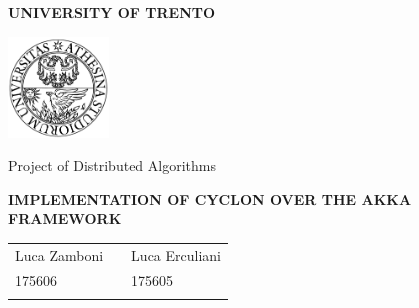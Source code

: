 \begin{center}
	{\bfseries\Huge {UNIVERSITY OF TRENTO}}

	\begin{center}
		\includegraphics[width=0.2\textwidth]{img/unitn}
	\end{center}
	\vspace{0.5cm}
	{\Large Project of Distributed Algorithms}
	\vspace{0.2cm}

	{ \bfseries \Large {IMPLEMENTATION OF CYCLON OVER THE AKKA FRAMEWORK}}
	\vspace{2.0cm}
	\large
	\begin{center}
		\begin{tabular}{lcl}
			Luca Zamboni & \hspace{5cm} &  Luca Erculiani \\
			175606 & \hspace{6cm} &  175605 \\ \\
		\end{tabular}
	\end{center}
	\vspace{1.0cm}
\end{center}